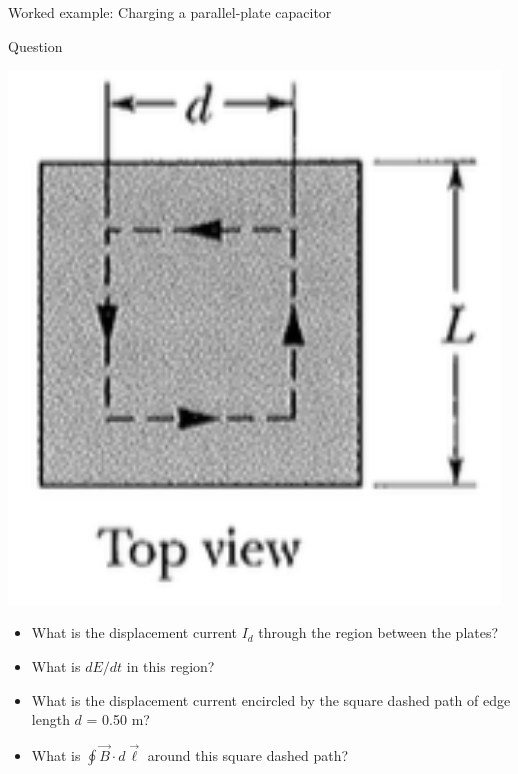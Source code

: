 {\begin{frame}{Worked example: Charging a parallel-plate capacitor}
\begin{blockexmplque}{Question}
\begin{minipage}[l]{0.19\textwidth}
     \begin{center}
    	 \includegraphics[width=0.98\textwidth]{./images/problems/lect08_parallel_plate_capacitor_top_view}\\
     \end{center}
    \end{minipage}
    \begin{minipage}[r]{0.60\textwidth}
      \begin{itemize}
        \item What is the displacement current $I_{d}$
          through the region between the plates?
        \item What is $dE/dt$ in this region?
        \item What is the displacement current encircled
          by the square dashed path of edge length $d$ = 0.50 m?
        \item What is $\oint \vec{B} \cdot d\vec{\ell}$
          around this square dashed path?
      \end{itemize}
    \end{minipage}

  \end{blockexmplque}

\end{frame}

}
